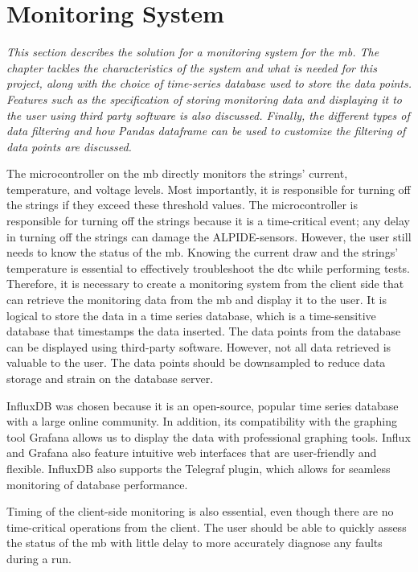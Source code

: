 \documentclass[main.tex]{subfiles}
\begin{document}
\section{Monitoring System}
\label{section: monitoring}
\textit{This section describes the solution for a monitoring system for the \gls{mb}. The chapter tackles the characteristics of the system and what is needed for this project, along with the choice of time-series database used to store the data points. Features such as the specification of storing monitoring data and displaying it to the user using third party software is also discussed. Finally, the different types of data filtering and how Pandas dataframe can be used to customize the filtering of data points are discussed.}


The microcontroller on the \gls{mb} directly monitors the strings' current, temperature, and voltage levels. Most importantly, it is responsible for turning off the strings if they exceed these threshold values. The microcontroller is responsible for turning off the strings because it is a time-critical event; any delay in turning off the strings can damage the ALPIDE-sensors. However, the user still needs to know the status of the \gls{mb}. Knowing the current draw and the strings' temperature is essential to effectively troubleshoot the \gls{dtc} while performing tests. Therefore, it is necessary to create a monitoring system from the client side that can retrieve the monitoring data from the \gls{mb} and display it to the user. It is logical to store the data in a time series database, which is a time-sensitive database that timestamps the data inserted. The data points from the database can be displayed using third-party software. However, not all data retrieved is valuable to the user. The data points should be downsampled to reduce data storage and strain on the database server.
 
InfluxDB was chosen because it is an open-source, popular time series database with a large online community. In addition, its compatibility with the graphing tool Grafana allows us to display the data with professional graphing tools. Influx and Grafana also feature intuitive web interfaces that are user-friendly and flexible. InfluxDB also supports the Telegraf plugin, which allows for seamless monitoring of database performance. 
 
 Timing of the client-side monitoring is also essential, even though there are no time-critical operations from the client. The user should be able to quickly assess the status of the \gls{mb} with little delay to more accurately diagnose any faults during a run.
 
\end{document}
